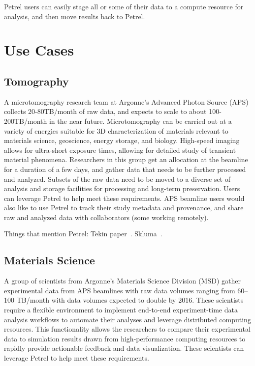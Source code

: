 \documentclass[sigconf]{acmart}
\begin{document}
Petrel users can easily stage all or some of their data to a compute resource for analysis, and then move results back to Petrel.



\section{Use Cases}

\subsection{Tomography}

A microtomography research team at Argonne's Advanced Photon Source (APS) collects 20-80TB/month of raw data, and expects to scale to about 100-200TB/month in the near future. Microtomography can be carried out at a variety of energies suitable for 3D characterization of materials relevant to materials science, geoscience, energy storage, and biology. High-speed imaging allows for ultra-short exposure times, allowing for detailed study of transient material phenomena. Researchers in this group get an allocation at the beamline for a duration of a few days, and gather data that needs to be further processed and analyzed. Subsets of the raw data need to be moved to a diverse set of analysis and storage facilities for processing and long-term preservation. Users can leverage Petrel to help meet these requirements. APS beamline users would also like to use Petrel to track their study metadata and provenance, and share raw and analyzed data with collaborators (some working remotely).

Things that mention Petrel: Tekin paper~\cite{bicer2016optimization}. Skluma~\cite{beckman2017skluma}.

\subsection{Materials Science}

A group of scientists from Argonne's Materials Science Division (MSD) gather experimental data from APS beamlines with raw data volumes ranging from 60--100 TB/month with data volumes expected to double by 2016. These scientists require a flexible environment to implement end-to-end experiment-time data analysis workflows to automate their analyses and leverage distributed computing resources. This functionality allows the researchers to compare their experimental data to simulation results drawn from high-performance computing resources to rapidly provide actionable feedback and data visualization. These scientists can leverage Petrel to help meet these requirements.
\end{document}
